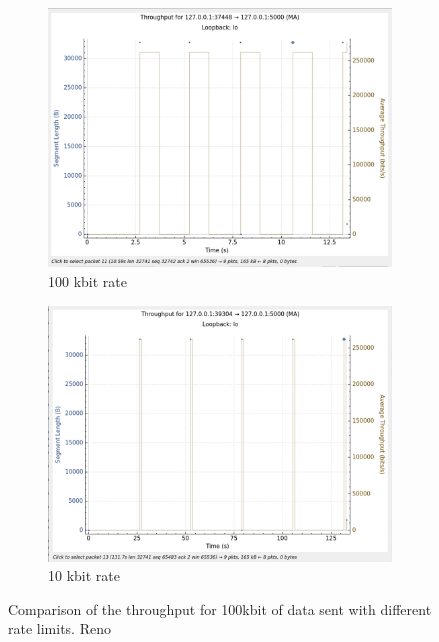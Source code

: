 \documentclass{report}
\begin{document}
\begin{figure}[H]
    \begin{subfigure}[b]{0.45\textwidth}
        \centering
        \includegraphics[width=\textwidth]{Pics/Reno/r100kbit_s100k_th}
        \caption{100 kbit rate}
    \end{subfigure}
    \hfill
    \begin{subfigure}[b]{0.45\textwidth}
        \centering
        \includegraphics[width=\textwidth]{Pics/Reno/r10kbit_s100k_th}
        \caption{10 kbit rate}
    \end{subfigure}
    \caption{Comparison of the throughput for 100kbit of data sent with different rate limits. Reno}
    \label{fig:four_images}
\end{figure}
\end{document}
